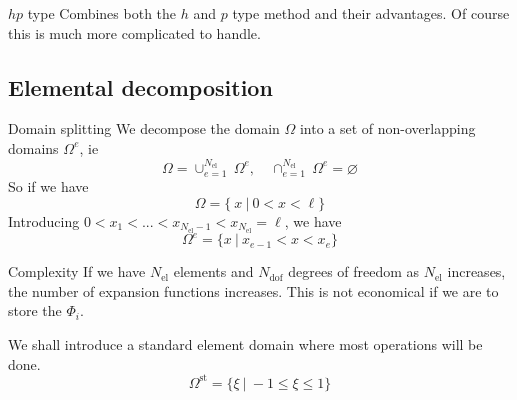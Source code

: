 \begin{frame}{$hp$ type}
  Combines both the $h$ and $p$ type method and their advantages. Of
  course this is much more complicated to handle.
\end{frame}


\subsection{Elemental decomposition}

\begin{frame}{Domain splitting}
  We decompose the domain $\Omega$ into a set of non-overlapping domains $\Omega^e$, ie
  \begin{equation}
    \label{eq:38}
    \Omega = \cup_{e=1}^{N_{\text{el}}}\ \Omega^e, \quad \cap_{e=1}^{N_\text{el}}\ \Omega^e = \varnothing
  \end{equation}
  So if we have
  \begin{equation}
    \label{eq:39}
    \Omega = \{\ x\ | \ 0 < x < \ell \}
  \end{equation}
  Introducing $0 < x_1 < ...< x_{N_\text{el}-1}  < x_{N_\text{el}} = \ell$, we have
  \begin{equation}
    \label{eq:40}
    \Omega^e = \{ x\ |\ x_{e-1} < x < x_e \}
  \end{equation}
  \begin{alertblock}{Complexity}
    If we have $N_{\text{el}}$ elements and $N_{\text{dof}}$ degrees
    of freedom as $N_{\text{el}}$ increases, the number of expansion
    functions increases. This is not economical if we are to store the $\Phi_i$.
  \end{alertblock}
  We shall introduce a standard element domain where most operations will be done.
  \begin{equation}
    \label{eq:41}
    \Omega^{\text{st}} = \{ \xi\ | \ -1 \leq \xi \leq 1 \}
  \end{equation}
\end{frame}
